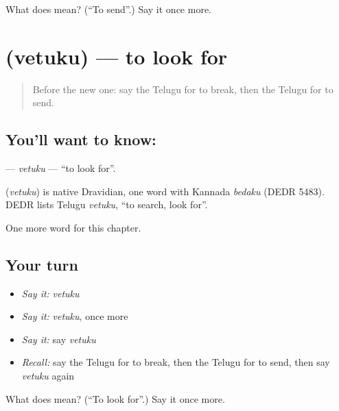 \begin{tcolorbox}[breakable,colback=teal!4,colframe=teal!35!black,title={Before you move on}]
What does  mean? (\textquotedblleft{}To send\textquotedblright{}.) Say it once more.
\end{tcolorbox}
\section[\texorpdfstring{\te{వెతుకు} (vetuku)}{వెతుకు (vetuku)}]{ (vetuku) — to look for}

\label{lesson:TE-C144-vetuku}



\begin{quote}
Before the new one: say the Telugu for to break, then the Telugu for to send.
\end{quote}

\subsection*{You'll want to know: }
\textbf{} — \emph{vetuku} — \textquotedblleft{}to look for\textquotedblright{}.

\begin{cousinweb}
\textbf{} (\emph{vetuku}) is native Dravidian, one word with Kannada \emph{bedaku} (DEDR 5483). DEDR lists Telugu \emph{vetuku}, \textquotedblleft{}to search, look for\textquotedblright{}.
\end{cousinweb}

\begin{grammarlens}[title={What you've built}]
One more word for this chapter.
\end{grammarlens}

\subsection*{Your turn}
\begin{itemize}
\raggedright
  \item \emph{Say it:} \emph{vetuku}
  \item \emph{Say it:} \emph{vetuku}, once more
  \item \emph{Say it:} say \emph{vetuku}
  \item \emph{Recall:} say the Telugu for to break, then the Telugu for to send, then say \emph{vetuku} again
\end{itemize}

\begin{tcolorbox}[breakable,colback=teal!4,colframe=teal!35!black,title={Before you move on}]
What does  mean? (\textquotedblleft{}To look for\textquotedblright{}.) Say it once more.
\end{tcolorbox}
